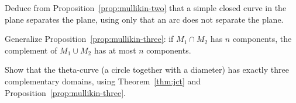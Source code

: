 \begin{exercise}
Deduce from Proposition~\ref{prop:mullikin-two} that a simple closed curve in the plane separates the
plane, using only that an arc does not separate the plane.
\end{exercise}

\begin{exercise}
Generalize Proposition~\ref{prop:mullikin-three}: if $M_1\cap M_2$ has $n$ components, the complement of
$M_1\cup M_2$ has at most $n$ components.
\end{exercise}

\begin{exercise}
Show that the theta-curve (a circle together with a diameter) has exactly three complementary
domains, using Theorem~\ref{thm:jct} and Proposition~\ref{prop:mullikin-three}.
\end{exercise}
